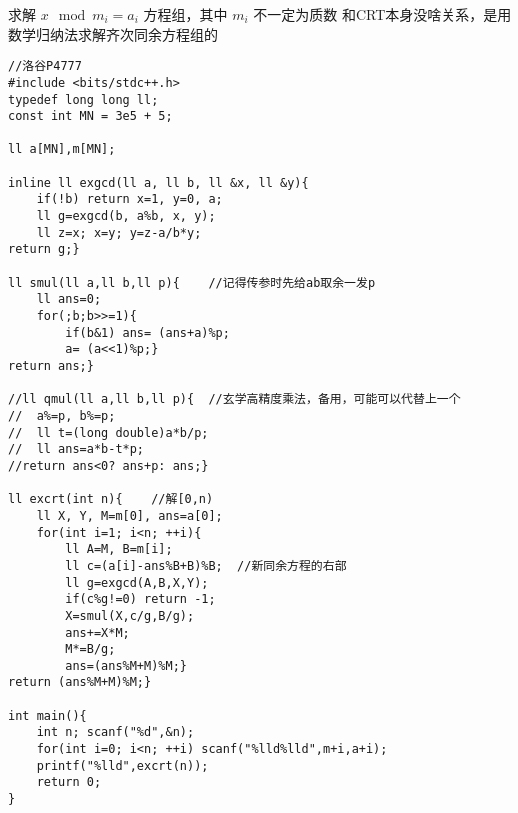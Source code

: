 求解 $x \mod m_i = a_i$ 方程组，其中 $m_i$ 不一定为质数
和CRT本身没啥关系，是用数学归纳法求解齐次同余方程组的
\begin{lstlisting}
//洛谷P4777 
#include <bits/stdc++.h>
typedef long long ll;
const int MN = 3e5 + 5;

ll a[MN],m[MN];

inline ll exgcd(ll a, ll b, ll &x, ll &y){
	if(!b) return x=1, y=0, a;
	ll g=exgcd(b, a%b, x, y);
	ll z=x; x=y; y=z-a/b*y;
return g;}

ll smul(ll a,ll b,ll p){	//记得传参时先给ab取余一发p
	ll ans=0;
	for(;b;b>>=1){
		if(b&1) ans= (ans+a)%p;
		a= (a<<1)%p;}
return ans;}

//ll qmul(ll a,ll b,ll p){	//玄学高精度乘法，备用，可能可以代替上一个
//	a%=p, b%=p;
//	ll t=(long double)a*b/p;
//	ll ans=a*b-t*p;
//return ans<0? ans+p: ans;}

ll excrt(int n){	//解[0,n)
	ll X, Y, M=m[0], ans=a[0];
	for(int i=1; i<n; ++i){
		ll A=M, B=m[i];
		ll c=(a[i]-ans%B+B)%B;	//新同余方程的右部
		ll g=exgcd(A,B,X,Y);
		if(c%g!=0) return -1;
		X=smul(X,c/g,B/g);
		ans+=X*M;
		M*=B/g;
		ans=(ans%M+M)%M;}
return (ans%M+M)%M;}

int main(){
	int n; scanf("%d",&n);
	for(int i=0; i<n; ++i) scanf("%lld%lld",m+i,a+i);
	printf("%lld",excrt(n));
	return 0;
}

\end{lstlisting}
